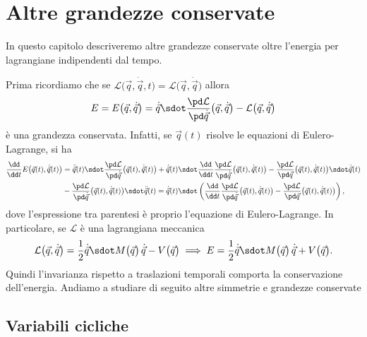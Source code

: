 \chapter{Altre grandezze conservate}
%
%

In questo capitolo descriveremo altre grandezze conservate oltre l'energia per lagrangiane indipendenti dal tempo.

Prima ricordiamo che se \(\mathcal{L}\big(\vec{q},\dot{\vec{q}},t\big) = \mathcal{L}\big(\vec{q},\dot{\vec{q}}\big)\) allora
\[
	E = E\big(\vec{q},\dot{\vec{q}}\big) = \dot{\vec{q}} \sdot \frac{\pd\mathcal{L}}{\pd\dot{\vec{q}}}\big(\vec{q},\dot{\vec{q}}\big) - \mathcal{L}\big(\vec{q},\dot{\vec{q}}\big)
\]
è una grandezza conservata.
Infatti, se \(\vec{q}(t)\) risolve le equazioni di Eulero-Lagrange, si ha
\[
	\begin{split}
		\frac{\dd}{\dd t}E\big(\vec{q}(t),\dot{\vec{q}}(t)\big) & = \ddot{\vec{q}}(t) \sdot \frac{\pd\mathcal{L}}{\pd\dot{\vec{q}}}\big(\vec{q}(t),\dot{\vec{q}}(t)\big) + \dot{\vec{q}}(t) \sdot \frac{\dd}{\dd t}\frac{\pd\mathcal{L}}{\pd\dot{\vec{q}}}\big(\vec{q}(t),\dot{\vec{q}}(t)\big) - \frac{\pd\mathcal{L}}{\pd\vec{q}}\big(\vec{q}(t),\dot{\vec{q}}(t)\big) \sdot \dot{\vec{q}}(t)\\
		& - \frac{\pd\mathcal{L}}{\pd\dot{\vec{q}}}\big(\vec{q}(t),\dot{\vec{q}}(t)\big) \sdot \ddot{\vec{q}}(t) = \dot{\vec{q}}(t) \sdot \left(\frac{\dd}{\dd t}\frac{\pd\mathcal{L}}{\pd\dot{\vec{q}}}\big(\vec{q}(t),\dot{\vec{q}}(t)\big)-\frac{\pd\mathcal{L}}{\pd\vec{q}}\big(\vec{q}(t),\dot{\vec{q}}(t)\big)\right),
	\end{split}
\]
dove l'espressione tra parentesi è proprio l'equazione di Eulero-Lagrange.
In particolare, se \(\mathcal{L}\) è una lagrangiana meccanica
\[
	\mathcal{L}\big(\vec{q},\dot{\vec{q}}\big) = \frac{1}{2}\dot{\vec{q}}\sdot M\big(\vec{q}\big)\,\dot{\vec{q}} - V\big(\vec{q}\big) \implies E = \frac{1}{2}\dot{\vec{q}}\sdot M\big(\vec{q}\big)\,\dot{\vec{q}} + V\big(\vec{q}\big).
\]
Quindi l'invarianza rispetto a traslazioni temporali comporta la conservazione dell'energia.
Andiamo a studiare di seguito altre simmetrie e grandezze conservate

\section{Variabili cicliche}

